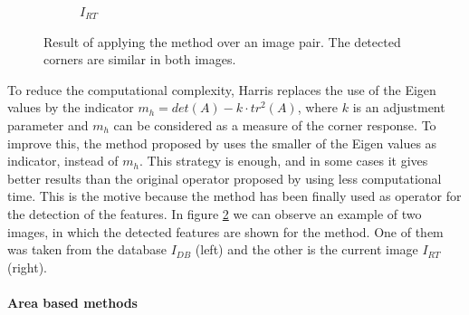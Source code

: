 \begin{figure}[h!]
\begin{subfigure}[b]{0.45\textwidth}
                \caption{$I_{RT}$}\label{fig:cp01_features_shi_2}
        \end{subfigure}%
        \caption{Result of applying the \cite{shi1994good} method over an image pair. The detected corners are similar in both images.}\label{fig:cp01_shi_tomasi_features}
\end{figure}

To reduce the computational complexity, Harris replaces the use of the Eigen values by the indicator $m_h = det(A) − k \cdot tr^2(A)$, where $k$ is an adjustment parameter and $m_h$ can be considered as a measure of the corner response. To improve this, the method proposed by \cite{shi1994good} uses the smaller of the Eigen values as indicator, instead of $m_h$. This strategy is enough, and in some cases it gives better results than the original operator proposed by \cite{harris1988combined} using less computational time. This is the motive because the \cite{shi1994good} method has been finally used as operator for the detection of the features. In figure \ref{fig:cp01_shi_tomasi_features} we can observe an example of two images, in which the detected features are shown for the \cite{shi1994good} method. One of them was taken from the database $I_{DB}$ (left) and the other is the current image $I_{RT}$ (right).

\paragraph{Area based methods}\label{ch:chapter01_01_02_01_02}

